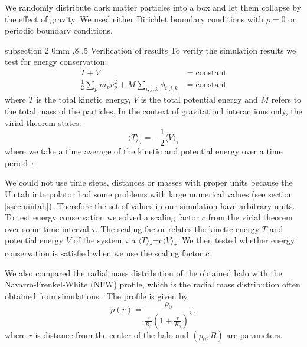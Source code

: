 \documentclass[notitlepage, 12pt]{article}
\makeatletter
\renewcommand{\subsection}{\@startsection    %
        {subsection}
        {2}
        {0mm}
        {.8\baselineskip}
        {.5\baselineskip}
        {\bfseries\normalsize}}
\makeatother
\begin{document}
We randomly distribute dark matter particles into a box and let them collapse by the effect of gravity. We used either Dirichlet boundary conditions with $\rho=0$ or periodic boundary conditions.    

\subsection{Verification of results} \label{sec:verification}
To verify the simulation results we test for energy conservation:
\begin{equation}
\begin{aligned}
T+V&=\mathrm{constant}\\
\frac{1}{2}\sum_{p} m_pv_p^2 + M\sum_{i,j,k}\phi_{i,j,k} &= \mathrm{constant} 
\end{aligned}
\end{equation}
where $T$ is the total kinetic energy, $V$ is the total potential energy and $M$ refers to the total mass of the particles. In the context of gravitationl interactions only, the virial theorem states:
\begin{equation}
\langle T \rangle_\tau = -\frac{1}{2}\langle V \rangle_\tau
\end{equation}
where we take a time average of the kinetic and potential energy over a time period $\tau$.


We could not use time steps, distances or masses with proper units because the Uintah interpolator had some problems with large numerical values (see section \ref{ssec:uintah}). Therefore the set of values in our simulation have arbitrary units. To test energy conservation we solved a scaling factor $c$ from the virial theorem over some time interval $\tau$. The scaling factor relates the kinetic energy $T$ and potential energy $V$ of the system via $\langle T \rangle_{\tau}$=c$\langle V\rangle_{\tau}$. We then tested whether energy conservation is satisfied when we use the scaling factor $c$.  

We also compared the radial mass distribution of the obtained halo with the Navarro-Frenkel-White (NFW) profile, which is the radial mass distribution often obtained from simulations \citep{Navarro1995}. The profile is given by  
\begin{equation}
\rho(r) = \frac{\rho_0}{\frac{r}{R_s}\left(1 + \frac{r}{R_s}\right)^2},
\label{eq:nfw}
\end{equation}
where $r$ is distance from the center of the halo and $(\rho_0,R)$ are parameters.    
\end{document}
